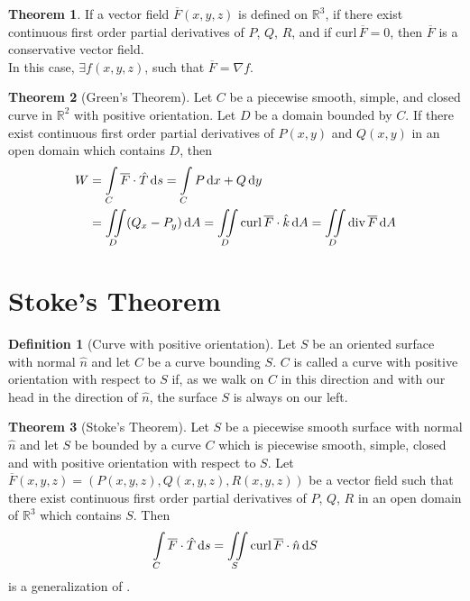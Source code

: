 \documentclass[fleqn, a4paper, 8pt, twoside]{amsart}
\theoremstyle{definition}
\theoremstyle{bluedefinition}
\newtheorem{definition}{Definition}
\theoremstyle{redtheorem}
\newtheorem{theorem}{Theorem}
\newcommand{\curl}{\mathrm{curl\,}}
\newcommand{\divergence}{\mathrm{div\,}}
\begin{document}
\begin{multicols}{2}
\begin{spacing}{0.7}
\begin{theorem}
	If a vector field $\overline{F}(x,y,z)$ is defined on $\mathbb{R}^3$, if there exist continuous first order partial derivatives of $P$, $Q$, $R$, and if $\curl \overline{F} = 0$, then $\overline{F}$ is a conservative vector field.\\
	In this case, $\exists f(x,y,z)$, such that $\overline{F} = \nabla f$.
\end{theorem}

\begin{theorem}[Green's Theorem]
	Let $C$ be a piecewise smooth, simple, and closed curve in $\mathbb{R}^2$ with positive orientation.
	Let $D$ be a domain bounded by $C$.
	If there exist continuous first order partial derivatives of $P(x,y)$ and $Q(x,y)$ in an open domain which contains $D$, then
	\begin{align*}
		W & = \int\limits_{C} \overline{F} \cdot \hat{T} \dif s = \int\limits_{C} P \dif x + Q \dif y\\
                  & = \iint\limits_{D} (Q_x - P_y) \dif A = \iint\limits_{D} \curl \overline{F} \cdot \hat{k} \dif A = \iint\limits_{D} \divergence \overline{F} \dif A
	\end{align*}
	\label{Green's_Theorem}
\end{theorem}

\section{Stoke's Theorem}

\begin{definition}[Curve with positive orientation]
	Let $S$ be an oriented surface with normal $\hat{n}$ and let $C$ be a curve bounding $S$.
	$C$ is called a curve with positive orientation with respect to $S$ if, as we walk on $C$ in this direction and with our head in the direction of $\hat{n}$, the surface $S$ is always on our left.
\end{definition}

\begin{theorem}[Stoke's Theorem]
	Let $S$ be a piecewise smooth surface with normal $\hat{n}$ and let $S$ be bounded by a curve $C$ which is piecewise smooth, simple, closed and with positive orientation with respect to $S$.
	Let $\overline{F}(x,y,z) = \left( P(x,y,z), Q(x,y,z), R(x,y,z) \right)$ be a vector field such that there exist continuous first order partial derivatives of $P$, $Q$, $R$ in an open domain of $\mathbb{R}^3$ which contains $S$.
	Then 
	\begin{equation*}
		\int\limits_{C} \overline{F} \cdot \hat{T} \dif s = \iint\limits_{S} \curl \overline{F} \cdot \hat{n} \dif S
	\end{equation*}
	 is a generalization of .
	\label{Stoke's_Theorem}
\end{theorem}


\end{spacing}
\end{multicols}
\end{document}
